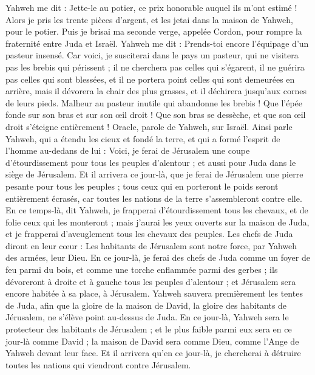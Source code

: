 \begin{multicols}{2}
Yahweh me dit : Jette-le au potier, ce prix honorable auquel ils m'ont estimé ! Alors je pris les trente pièces d'argent, et les jetai dans la maison de Yahweh, pour le potier.
Puis je brisai ma seconde verge, appelée Cordon, pour rompre la fraternité entre Juda et Israël.
Yahweh me dit : Prends-toi encore l'équipage d'un pasteur insensé.
Car voici, je susciterai dans le pays un pasteur, qui ne visitera pas les brebis qui périssent ; il ne cherchera pas celles qui s'égarent, il ne guérira pas celles qui sont blessées, et il ne portera point celles qui sont demeurées en arrière, mais il dévorera la chair des plus grasses, et il déchirera jusqu'aux cornes de leurs pieds.
Malheur au pasteur inutile qui abandonne les brebis ! Que l'épée fonde sur son bras et sur son œil droit ! Que son bras se dessèche, et que son œil droit s'éteigne entièrement !
\VerseOne{}Oracle, parole de Yahweh, sur Israël. Ainsi parle Yahweh, qui a étendu les cieux et fondé la terre, et qui a formé l'esprit de l'homme au-dedans de lui :
Voici, je ferai de Jérusalem une coupe d'étourdissement pour tous les peuples d'alentour ; et aussi pour Juda dans le siège de Jérusalem.
Et il arrivera ce jour-là, que je ferai de Jérusalem une pierre pesante pour tous les peuples ; tous ceux qui en porteront le poids seront entièrement écrasés, car toutes les nations de la terre s'assembleront contre elle.
En ce temps-là, dit Yahweh, je frapperai d'étourdissement tous les chevaux, et de folie ceux qui les monteront ; mais j'aurai les yeux ouverts sur la maison de Juda, et je frapperai d'aveuglement tous les chevaux des peuples.
Les chefs de Juda diront en leur cœur : Les habitants de Jérusalem sont notre force, par Yahweh des armées, leur Dieu.
En ce jour-là, je ferai des chefs de Juda comme un foyer de feu parmi du bois, et comme une torche enflammée parmi des gerbes ; ils dévoreront à droite et à gauche tous les peuples d'alentour ; et Jérusalem sera encore habitée à sa place, à Jérusalem.
Yahweh sauvera premièrement les tentes de Juda, afin que la gloire de la maison de David, la gloire des habitants de Jérusalem, ne s'élève point au-dessus de Juda.
En ce jour-là, Yahweh sera le protecteur des habitants de Jérusalem ; et le plus faible parmi eux sera en ce jour-là comme David ; la maison de David sera comme Dieu, comme l'Ange de Yahweh devant leur face.
Et il arrivera qu'en ce jour-là, je chercherai à détruire toutes les nations qui viendront contre Jérusalem.

\end{multicols}
